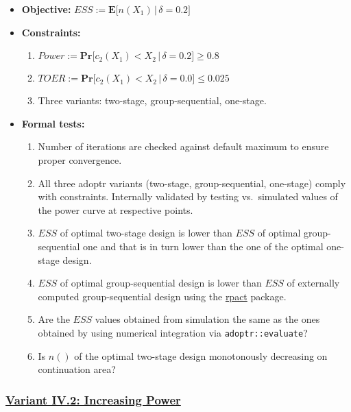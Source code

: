 \documentclass[]{book}
\providecommand{\tightlist}{%
  \setlength{\itemsep}{0pt}\setlength{\parskip}{0pt}}
\begin{document}
\begin{itemize}
\tightlist
\item
  \textbf{Objective:} \(ESS := \boldsymbol{E}\big[n(X_1)\,|\,\delta=0.2\big]\)
\item
  \textbf{Constraints:}

  \begin{enumerate}
  \def\labelenumi{\arabic{enumi}.}
  \tightlist
  \item
    \(Power := \boldsymbol{Pr}\big[c_2(X_1) < X_2\,|\,\delta=0.2\big] \geq 0.8\)
  \item
    \(TOER := \boldsymbol{Pr}\big[c_2(X_1) < X_2\,|\,\delta=0.0\big] \leq 0.025\)
  \item
    Three variants: two-stage, group-sequential, one-stage.
  \end{enumerate}
\item
  \textbf{Formal tests:}

  \begin{enumerate}
  \def\labelenumi{\arabic{enumi}.}
  \tightlist
  \item
    Number of iterations are checked against default maximum to ensure proper
    convergence.
  \item
    All three adoptr variants (two-stage, group-sequential, one-stage)
    comply with constraints. Internally validated by testing vs.~simulated
    values of the power curve at respective points.
  \item
    \(ESS\) of optimal two-stage design is lower than \(ESS\) of optimal
    group-sequential one and that is in turn lower than the one of the
    optimal one-stage design.
  \item
    \(ESS\) of optimal group-sequential design is lower than \(ESS\) of
    externally computed group-sequential design using the \href{https://rpact.org/}{rpact} package.
  \item
    Are the \(ESS\) values obtained from simulation the same as the ones
    obtained by using numerical integration via \texttt{adoptr::evaluate}?
  \item
    Is \(n()\) of the optimal two-stage design monotonously decreasing on
    continuation area?
  \end{enumerate}
\end{itemize}

\hypertarget{variant-iv.2-increasing-power}{%
\subsubsection{\texorpdfstring{\protect\hyperlink{variantIV_2}{Variant IV.2: Increasing Power}}{Variant IV.2: Increasing Power}}\label{variant-iv.2-increasing-power}}
\end{document}
